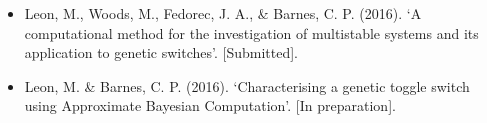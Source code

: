 \begin{itemize}
	\item Leon, M., Woods, M., Fedorec, J. A., \& Barnes, C. P. (2016). ‘A computational method for the investigation of multistable systems and its application to genetic switches’. [Submitted].
	\item Leon, M. \& Barnes, C. P. (2016). ‘Characterising a genetic toggle switch using Approximate Bayesian Computation'. [In preparation].
	
\end{itemize}